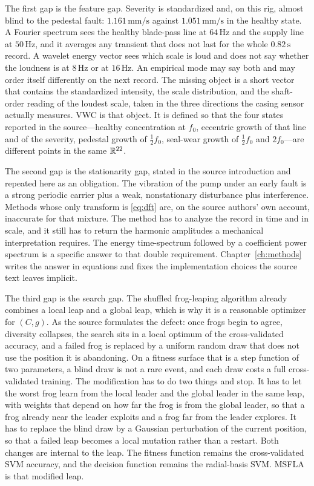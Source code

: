 The first gap is the feature gap.
Severity is standardized and, on this rig, almost blind to the pedestal fault: \(1.161\,\mathrm{mm/s}\) against \(1.051\,\mathrm{mm/s}\) in the healthy state.
A Fourier spectrum sees the healthy blade-pass line at \(64\,\mathrm{Hz}\) and the supply line at \(50\,\mathrm{Hz}\), and it averages any transient that does not last for the whole \(0.82\,\mathrm{s}\) record.
A wavelet energy vector sees which scale is loud and does not say whether the loudness is at \(8\,\mathrm{Hz}\) or at \(16\,\mathrm{Hz}\).
An empirical mode may say both and may order itself differently on the next record.
The missing object is a short vector that contains the standardized intensity, the scale distribution, and the shaft-order reading of the loudest scale, taken in the three directions the casing sensor actually measures.
VWC is that object.
It is defined so that the four states reported in the source---healthy concentration at \(f_{0}\), eccentric growth of that line and of the severity, pedestal growth of \(\tfrac12 f_{0}\), seal-wear growth of \(\tfrac12 f_{0}\) and \(2f_{0}\)—are different points in the same \(\mathbb{R}^{22}\).

The second gap is the stationarity gap, stated in the source introduction and repeated here as an obligation.
The vibration of the pump under an early fault is a strong periodic carrier plus a weak, nonstationary disturbance plus interference.
Methods whose only transform is \eqref{eq:dft} are, on the source authors' own account, inaccurate for that mixture.
The method has to analyze the record in time and in scale, and it still has to return the harmonic amplitudes a mechanical interpretation requires.
The energy time-spectrum followed by a coefficient power spectrum is a specific answer to that double requirement.
Chapter~\ref{ch:methods} writes the answer in equations and fixes the implementation choices the source text leaves implicit.

The third gap is the search gap.
The shuffled frog-leaping algorithm already combines a local leap and a global leap, which is why it is a reasonable optimizer for \((C, g)\).
As the source formulates the defect: once frogs begin to agree, diversity collapses, the search sits in a local optimum of the cross-validated accuracy, and a failed frog is replaced by a uniform random draw that does not use the position it is abandoning.
On a fitness surface that is a step function of two parameters, a blind draw is not a rare event, and each draw costs a full cross-validated training.
The modification has to do two things and stop.
It has to let the worst frog learn from the local leader and the global leader in the same leap, with weights that depend on how far the frog is from the global leader, so that a frog already near the leader exploits and a frog far from the leader explores.
It has to replace the blind draw by a Gaussian perturbation of the current position, so that a failed leap becomes a local mutation rather than a restart.
Both changes are internal to the leap.
The fitness function remains the cross-validated SVM accuracy, and the decision function remains the radial-basis SVM.
MSFLA is that modified leap.

